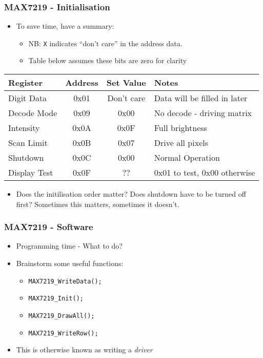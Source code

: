 \documentclass[14pt]{beamer}
\begin{document}
\begin{frame}[fragile]
\frametitle{MAX7219 - Initialisation}
\begin{itemize}
\small
\item To save time, have a summary:
\begin{itemize}
	\item NB: \texttt{X} indicates ``don't care'' in the address data.
	\item Table below assumes these bits are zero for clarity
\end{itemize}
\end{itemize}
\vspace{-0.5cm}
\begin{center}
\small
\begin{tabular}{ |l|c|c|l| } 
 \hline
Register & Address & Set Value & Notes \\
  \hline
Digit Data & 0x01 & Don't care & Data will be filled in later \\
Decode Mode & 0x09 & 0x00 & No decode - driving matrix \\
Intensity & 0x0A &  0x0F & Full brightness \\
Scan Limit & 0x0B & 0x07 & Drive all pixels \\
Shutdown & 0x0C & 0x00 & Normal Operation \\
Display Test & 0x0F & ?? & 0x01 to test, 0x00 otherwise\\
\hline
\end{tabular}
\end{center}
\begin{itemize}
\small
\item Does the initilisation order matter? Does shutdown have to be turned off first? Sometimes this matters, sometimes it doesn't.
\end{itemize}
\end{frame}

\begin{frame}[fragile]
\frametitle{MAX7219 - Software}
\begin{itemize}
\item Programming time - What to do?
\item Brainstorm some useful functions:
\begin{itemize}
\item \texttt{MAX7219\_WriteData();}
\item \texttt{MAX7219\_Init();}
\item \texttt{MAX7219\_DrawAll();}
\item \texttt{MAX7219\_WriteRow();}
\end{itemize}
\item This is otherwise known as writing a \textit{driver}
\end{itemize}
\end{frame}
\end{document}
